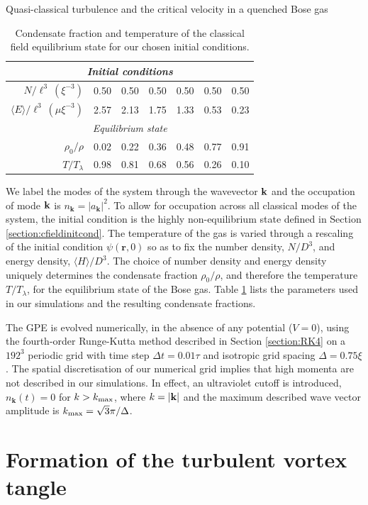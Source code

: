 \begin{chapter}{\label{cha:nonequib}Quasi-classical turbulence and the critical velocity in a quenched Bose gas}
\begin{table}
\centering
\begin{tabular}{rcccccc}
\multicolumn{7}{c}{\it Initial conditions} \\
\hline
\rule{0pt}{3ex}$N/\ell^3~(\xi^{-3})$           & 0.50 & 0.50 & 0.50 & 0.50 & 0.50 & 0.50 \\
$\langle E \rangle/\ell^3~(\mu \xi^{-3})$  & 2.57 & 2.13 & 1.75 & 1.33 & 0.53 & 0.23 \\
\multicolumn{7}{c}{\it Equilibrium state} \\
\hline
\rule{0pt}{3ex}$\rho_0/\rho$        & 0.02 & 0.22 & 0.36 & 0.48 & 0.77 & 0.91 \\
$T/T_\lambda$        & 0.98 & 0.81 & 0.68 & 0.56 & 0.26 & 0.10
\end{tabular}
\caption{Condensate fraction and temperature of the classical field equilibrium state for our chosen initial conditions.}
\label{tbl:cond_frac}
\end{table}

We label the modes of the system through the wavevector ${\bf k}$ and the occupation of mode ${\bf k}$ is $n_{\mathbf{k}}=|a_{\mathbf{k}}|^2$. To allow for occupation across all classical modes of the system, the initial condition is the highly non-equilibrium state defined in Section \ref{section:cfieldinitcond}.  The temperature of the gas is varied through a rescaling of the initial condition $\psi(\mathbf{r},0)$ so as to fix the number density, $N/D^3$, and energy density, $\langle H \rangle/D^3$. The choice of number density and energy density uniquely determines the condensate fraction $\rho_0/\rho$, and therefore the temperature $T/T_\lambda$, for the equilibrium state of the Bose gas. Table \ref{tbl:cond_frac} lists the parameters used in our simulations and the resulting condensate fractions.

The GPE is evolved numerically, in the absence of any potential ($V = 0$), using the fourth-order Runge-Kutta method described in Section \ref{section:RK4} on a $192^3$ periodic grid with time step $\Delta t =0.01 \tau$ and isotropic grid spacing $\Delta =0.75\xi$. The spatial discretisation of our numerical grid implies that high momenta are not described in our simulations. In effect, an ultraviolet cutoff is introduced, $n_{\mathbf{k}}(t)=0$ for $k>k_{\rm{max}}$, where $k=|{\bf k}|$ and the maximum described wave vector amplitude is $k_{\rm{max}} = \sqrt{3} \pi / \Delta$. 

\section{Formation of the turbulent vortex tangle}

\end{chapter}

